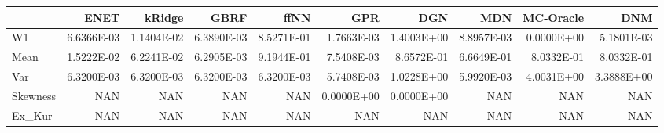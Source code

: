 \begin{tabular}{lrrrrrrrrr}
\toprule
{} &       ENET &     kRidge &       GBRF &       ffNN &        GPR &        DGN &        MDN &  MC-Oracle &        DNM \\
\midrule
W1       & 6.6366E-03 & 1.1404E-02 & 6.3890E-03 & 8.5271E-01 & 1.7663E-03 & 1.4003E+00 & 8.8957E-03 & 0.0000E+00 & 5.1801E-03 \\
Mean     & 1.5222E-02 & 6.2241E-02 & 6.2905E-03 & 9.1944E-01 & 7.5408E-03 & 8.6572E-01 & 6.6649E-01 & 8.0332E-01 & 8.0332E-01 \\
Var      & 6.3200E-03 & 6.3200E-03 & 6.3200E-03 & 6.3200E-03 & 5.7408E-03 & 1.0228E+00 & 5.9920E-03 & 4.0031E+00 & 3.3888E+00 \\
Skewness &        NAN &        NAN &        NAN &        NAN & 0.0000E+00 & 0.0000E+00 &        NAN &        NAN &        NAN \\
Ex\_Kur   &        NAN &        NAN &        NAN &        NAN &        NAN &        NAN &        NAN &        NAN &        NAN \\
\bottomrule
\end{tabular}
